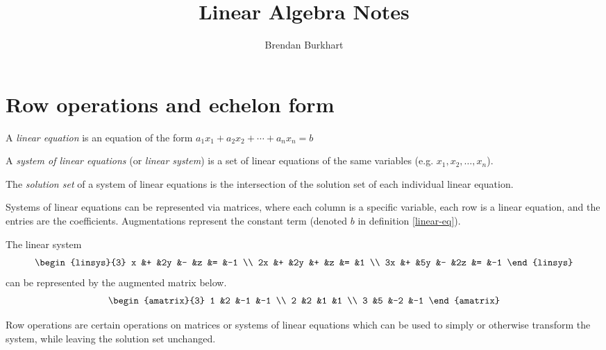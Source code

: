 \documentclass[12pt]{article}
\begin{document}
\title{Linear Algebra Notes}
\author{Brendan Burkhart}
\maketitle

\tableofcontents
\newpage

\section{Row operations and echelon form}

\begin{defn}\label{linear-eq}
    A \emph{linear equation} is an equation of the form $a_1x_1 + a_2x_2 + \cdots + a_nx_n = b$
\end{defn}

\begin{defn}\label{linear-sys}
    A \emph{system of linear equations} (or \emph{linear system}) is a set of linear equations of the same variables (e.g. $x_1, x_2, \ldots, x_n$).
\end{defn}

\begin{defn}\label{linear-sys-solutions}
    The \emph{solution set} of a system of linear equations is the intersection of the solution set of each individual linear equation.
\end{defn}

Systems of linear equations can be represented via matrices, where each column is a specific variable, each row is a linear equation, and the entries are the coefficients. Augmentations represent the constant term (denoted $b$ in definition \ref{linear-eq}).

\begin{exmp}
    The linear system \[\begin{linsys}{3}
            x &+ &2y &- &z &= &-1 \\
            2x &+ &2y &+ &z &= &1 \\
            3x &+ &5y &- &2z &= &-1
        \end{linsys}\] can be represented by the augmented matrix below.
    \[\begin{amatrix}{3}
            1 &2 &-1 &-1 \\
            2 &2 &1 &1 \\
            3 &5 &-2 &-1
        \end{amatrix}\]
\end{exmp}

Row operations are certain operations on matrices or systems of linear equations which can be used to simply or otherwise transform the system, while leaving the solution set unchanged.
\end{document}
